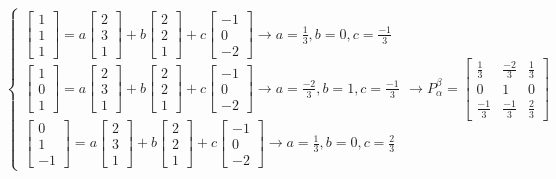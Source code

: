 $
\begin{cases}
	\begin{bmatrix}
		1 \\ 1 \\ 1
	\end{bmatrix} = a\begin{bmatrix}
	2 \\ 3 \\ 1
	\end{bmatrix} + b\begin{bmatrix}
	2 \\ 2 \\ 1
	\end{bmatrix} + c\begin{bmatrix}
	-1 \\ 0 \\ -2
	\end{bmatrix} \longrightarrow a=\frac{1}{3} , b = 0 , c = \frac{-1}{3}
	 \\ 
	\begin{bmatrix}
	1 \\ 0 \\ 1
	\end{bmatrix} = a\begin{bmatrix}
	2 \\ 3 \\ 1
	\end{bmatrix} + b\begin{bmatrix}
	2 \\ 2 \\ 1
	\end{bmatrix} + c\begin{bmatrix}
	-1 \\ 0 \\ -2	
	\end{bmatrix} \longrightarrow a=\frac{-2}{3} , b = 1 , c = \frac{-1}{3}
	\\
	\begin{bmatrix}
		0 \\ 1 \\ -1
	\end{bmatrix} = a\begin{bmatrix}
		2 \\ 3 \\ 1
	\end{bmatrix} + b\begin{bmatrix}
		2 \\ 2 \\ 1
	\end{bmatrix} + c\begin{bmatrix}
		-1 \\ 0 \\ -2	
	\end{bmatrix} \longrightarrow a=\frac{1}{3} , b = 0 , c = \frac{2}{3}
\end{cases}	 \longrightarrow P^\beta_\alpha = \begin{bmatrix}
\frac{1}{3} & \frac{-2}{3} & \frac{1}{3} \\
0 & 1 & 0 \\
\frac{-1}{3} & \frac{-1}{3} & \frac{2}{3}
\end{bmatrix}
$

